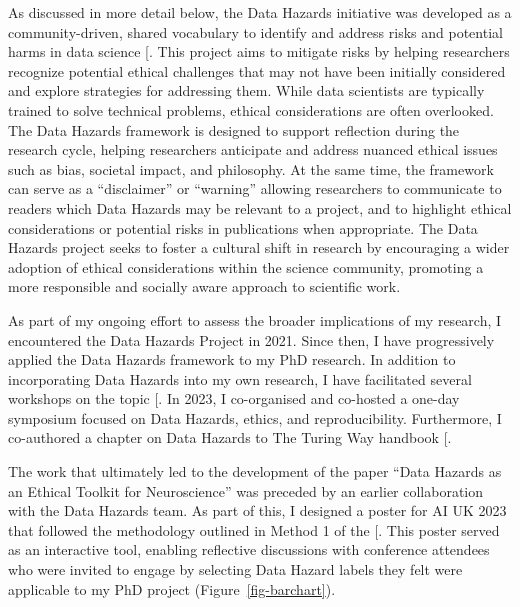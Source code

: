 \documentclass[
  11pt,
  letterpaper,
]{scrreprt}
\begin{document}
As discussed in more detail below, the Data Hazards initiative was
developed as a community-driven, shared vocabulary to identify and
address risks and potential harms in data science
{[}\citeproc{ref-zelenka2023Data}{426}{]}. This project aims to mitigate
risks by helping researchers recognize potential ethical challenges that
may not have been initially considered and explore strategies for
addressing them. While data scientists are typically trained to solve
technical problems, ethical considerations are often overlooked. The
Data Hazards framework is designed to support reflection during the
research cycle, helping researchers anticipate and address nuanced
ethical issues such as bias, societal impact, and philosophy. At the
same time, the framework can serve as a ``disclaimer'' or ``warning''
allowing researchers to communicate to readers which Data Hazards may be
relevant to a project, and to highlight ethical considerations or
potential risks in publications when appropriate. The Data Hazards
project seeks to foster a cultural shift in research by encouraging a
wider adoption of ethical considerations within the science community,
promoting a more responsible and socially aware approach to scientific
work.

As part of my ongoing effort to assess the broader implications of my
research, I encountered the Data Hazards Project in 2021. Since then, I
have progressively applied the Data Hazards framework to my PhD
research. In addition to incorporating Data Hazards into my own
research, I have facilitated several workshops on the topic
{[}\citeproc{ref-roman-garcia2022Data}{427}{]}. In 2023, I co-organised
and co-hosted a one-day symposium focused on Data Hazards, ethics, and
reproducibility. Furthermore, I co-authored a chapter on Data Hazards to
The Turing Way handbook
{[}\citeproc{ref-turingwaycommunity2019TuringWayHandbook}{357}{]}.

The work that ultimately led to the development of the paper ``Data
Hazards as an Ethical Toolkit for Neuroscience'' was preceded by an
earlier collaboration with the Data Hazards team. As part of this, I
designed a poster for AI UK 2023 that followed the methodology outlined
in Method 1 of the {[}\citeproc{ref-romangarcia2023Data}{380}{]}. This
poster served as an interactive tool, enabling reflective discussions
with conference attendees who were invited to engage by selecting Data
Hazard labels they felt were applicable to my PhD project
(Figure~\ref{fig-barchart}).
\end{document}
